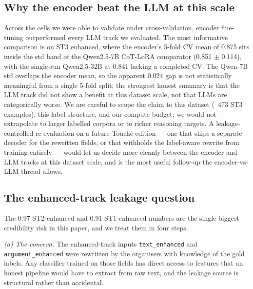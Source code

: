 \subsection{Why the encoder beat the LLM at this scale}
\label{sec:disc-encoder}

Across the cells we were able to validate under cross-validation, encoder fine-tuning outperformed every LLM track we evaluated. The most informative comparison is on ST3 enhanced, where the encoder's 5-fold CV mean of 0.875 sits inside the std band of the Qwen2.5-7B CoT-LoRA comparator (0.851 $\pm$ 0.114), with the single-run Qwen2.5-32B at 0.841 lacking a completed CV. %
The Qwen-7B std overlaps the encoder mean, so the apparent 0.024 gap is not statistically meaningful from a single 5-fold split; the strongest honest summary is that the LLM track did not show a benefit at this dataset scale, not that LLMs are categorically worse. We are careful to scope the claim to this dataset (~473 ST3 examples), this label structure, and our compute budget; we would not extrapolate to larger labelled corpora or to richer reasoning targets. A leakage-controlled re-evaluation on a future Touch\'{e} edition --- one that ships a separate decoder for the rewritten fields, or that withholds the label-aware rewrite from training entirely --- would let us decide more cleanly between the encoder and LLM tracks at this dataset scale, and is the most useful follow-up the encoder-vs-LLM thread allows.

\subsection{The enhanced-track leakage question}
\label{sec:disc-leakage}

The 0.97 ST2-enhanced and 0.91 ST1-enhanced numbers are the single biggest credibility risk in this paper, and we treat them in four steps. %

\emph{(a) The concern.} The enhanced-track inputs \texttt{text\_enhanced} and \texttt{argument\_enhanced} were rewritten by the organisers with knowledge of the gold labels. Any classifier trained on those fields has direct access to features that an honest pipeline would have to extract from raw text, and the leakage source is structural rather than accidental.

